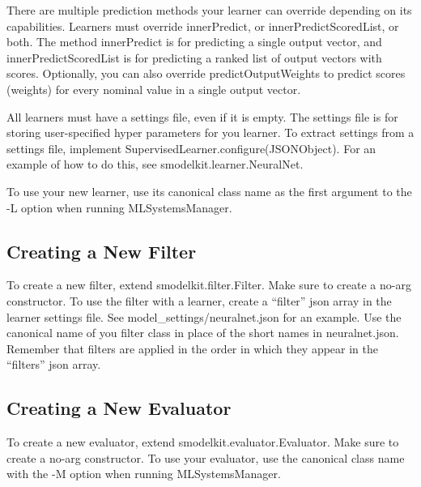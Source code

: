 \documentclass[twoside,11pt]{article}
\begin{document}
There are multiple prediction methods your learner can override depending on its capabilities. Learners must override innerPredict, or innerPredictScoredList, or both. The method innerPredict is for predicting a single output vector, and innerPredictScoredList is for predicting a ranked list of output vectors with scores. Optionally, you can also override predictOutputWeights to predict scores (weights) for every nominal value in a single output vector.

All learners must have a settings file, even if it is empty. The settings file is for storing user-specified hyper parameters for you learner. To extract settings from a settings file, implement SupervisedLearner.configure(JSONObject). For an example of how to do this, see smodelkit.learner.NeuralNet.

To use your new learner, use its canonical class name as the first argument to the -L option when running MLSystemsManager.


\subsection{Creating a New Filter}

To create a new filter, extend smodelkit.filter.Filter. Make sure to create a no-arg constructor. To use the filter with a learner, create a ``filter'' json array in the learner settings file. See model\_settings/neuralnet.json for an example. Use the canonical name of you filter class in place of the short names in neuralnet.json. Remember that filters are applied in the order in which they appear in the ``filters'' json array.

\subsection{Creating a New Evaluator}

To create a new evaluator, extend smodelkit.evaluator.Evaluator. Make sure to create a no-arg constructor. To use your evaluator, use the canonical class name with the -M option when running MLSystemsManager.
\end{document}
